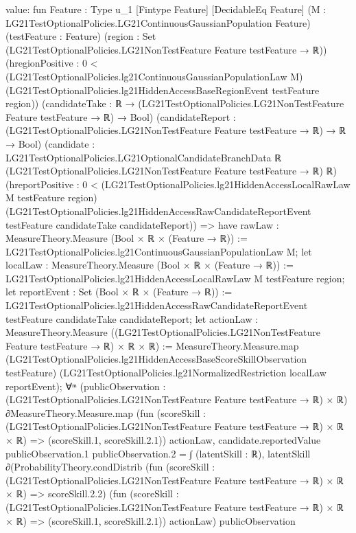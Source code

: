 \documentclass[10pt]{article}
\begin{document}
\begin{ReviewVerbatim}
value:
fun {Feature : Type u_1} [Fintype Feature] [DecidableEq Feature]
    (M : LG21TestOptionalPolicies.LG21ContinuousGaussianPopulation Feature) (testFeature : Feature)
    (region : Set (LG21TestOptionalPolicies.LG21NonTestFeature Feature testFeature → ℝ))
    (hregionPositive :
      0 <
        (LG21TestOptionalPolicies.lg21ContinuousGaussianPopulationLaw M)
          (LG21TestOptionalPolicies.lg21HiddenAccessBaseRegionEvent testFeature region))
    (candidateTake : ℝ → (LG21TestOptionalPolicies.LG21NonTestFeature Feature testFeature → ℝ) → Bool)
    (candidateReport : (LG21TestOptionalPolicies.LG21NonTestFeature Feature testFeature → ℝ) → ℝ → Bool)
    (candidate :
      LG21TestOptionalPolicies.LG21OptionalCandidateBranchData ℝ
        (LG21TestOptionalPolicies.LG21NonTestFeature Feature testFeature → ℝ) ℝ)
    (hreportPositive :
      0 <
        (LG21TestOptionalPolicies.lg21HiddenAccessLocalRawLaw M testFeature region)
          (LG21TestOptionalPolicies.lg21HiddenAccessRawCandidateReportEvent testFeature candidateTake
            candidateReport)) =>
  have rawLaw : MeasureTheory.Measure (Bool × ℝ × (Feature → ℝ)) :=
    LG21TestOptionalPolicies.lg21ContinuousGaussianPopulationLaw M;
  let localLaw : MeasureTheory.Measure (Bool × ℝ × (Feature → ℝ)) :=
    LG21TestOptionalPolicies.lg21HiddenAccessLocalRawLaw M testFeature region;
  let reportEvent : Set (Bool × ℝ × (Feature → ℝ)) :=
    LG21TestOptionalPolicies.lg21HiddenAccessRawCandidateReportEvent testFeature candidateTake candidateReport;
  let actionLaw :
    MeasureTheory.Measure ((LG21TestOptionalPolicies.LG21NonTestFeature Feature testFeature → ℝ) × ℝ × ℝ) :=
    MeasureTheory.Measure.map (LG21TestOptionalPolicies.lg21HiddenAccessBaseScoreSkillObservation testFeature)
      (LG21TestOptionalPolicies.lg21NormalizedRestriction localLaw reportEvent);
  ∀ᵐ (publicObservation :
    (LG21TestOptionalPolicies.LG21NonTestFeature Feature testFeature → ℝ) ×
      ℝ) ∂MeasureTheory.Measure.map
      (fun (scoreSkill : (LG21TestOptionalPolicies.LG21NonTestFeature Feature testFeature → ℝ) × ℝ × ℝ) =>
        (scoreSkill.1, scoreSkill.2.1))
      actionLaw,
    candidate.reportedValue publicObservation.1 publicObservation.2 =
      ∫ (latentSkill : ℝ),
        latentSkill ∂(ProbabilityTheory.condDistrib
            (fun (scoreSkill : (LG21TestOptionalPolicies.LG21NonTestFeature Feature testFeature → ℝ) × ℝ × ℝ) =>
              scoreSkill.2.2)
            (fun (scoreSkill : (LG21TestOptionalPolicies.LG21NonTestFeature Feature testFeature → ℝ) × ℝ × ℝ) =>
              (scoreSkill.1, scoreSkill.2.1))
            actionLaw)
          publicObservation
\end{ReviewVerbatim}
\end{document}
